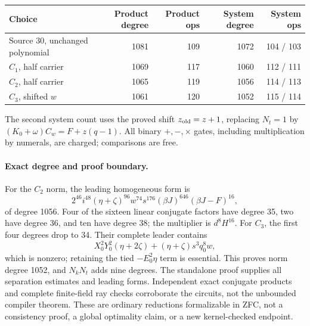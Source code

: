 \begin{center}
\begin{tabular}{lrrrr}
\hline
Choice & Product degree & Product ops & System degree & System ops\\
\hline
Source 30, unchanged polynomial &1081&109&1072&104 / 103\\
$C_1$, half carrier &1069&117&1060&112 / 111\\
$C_2$, half carrier &1065&119&1056&114 / 113\\
$C_3$, shifted $w$ &1061&120&1052&115 / 114\\
\hline
\end{tabular}
\end{center}
The second system count uses the proved shift $z_{\rm old}=z+1$, replacing
$N_t=1$ by $(K_0+\omega)C_w=F+z(q-1)$.  All binary $+,-,\times$ gates,
including multiplication by numerals, are charged; comparisons are free.

\paragraph{Exact degree and proof boundary.}
For the $C_2$ norm, the leading homogeneous form is
\[
 2^{46}i^{48}(\eta+\zeta)^{96}w^{74}s^{176}
 (\beta J)^{646}(\beta J-F)^{16},
\]
of degree 1056.  Four of the sixteen linear conjugate factors have degree
35, two have degree 36, and ten have degree 38; the multiplier is $d^8H^{16}$.
For $C_3$, the first four degrees drop to 34.  Their complete leader contains
\[
 X_0^2Y_0^2(\eta+2\zeta)+(\eta+\zeta)s^3q_0^8w,
\]
which is nonzero; retaining the tied $-E_0^2\eta$ term is essential.
This proves norm degree 1052, and $N_kN_t$ adds nine degrees.
The standalone proof supplies all separation estimates and leading forms.
Independent exact conjugate products and complete finite-field ray checks
corroborate the circuits, not the unbounded compiler theorem.
These are ordinary reductions formalizable in ZFC, not a consistency proof,
a global optimality claim, or a new kernel-checked endpoint.
